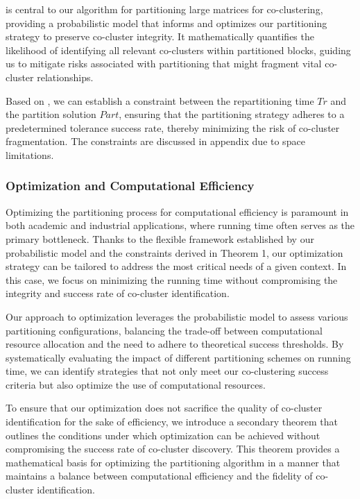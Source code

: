  is central to our algorithm for partitioning large matrices for co-clustering, providing a probabilistic model that informs and optimizes our partitioning strategy to preserve co-cluster integrity. It mathematically quantifies the likelihood of identifying all relevant co-clusters within partitioned blocks, guiding us to mitigate risks associated with partitioning that might fragment vital co-cluster relationships.

Based on , we can establish a constraint between the repartitioning time $Tr$ and the partition solution $Part$, ensuring that the partitioning strategy adheres to a predetermined tolerance success rate, thereby minimizing the risk of co-cluster fragmentation. The constraints are discussed in appendix due to space limitations.

\subsubsection{Optimization and Computational Efficiency}
Optimizing the partitioning process for computational efficiency is paramount in both academic and industrial applications, where running time often serves as the primary bottleneck. Thanks to the flexible framework established by our probabilistic model and the constraints derived in Theorem 1, our optimization strategy can be tailored to address the most critical needs of a given context. In this case, we focus on minimizing the running time without compromising the integrity and success rate of co-cluster identification.

Our approach to optimization leverages the probabilistic model to assess various partitioning configurations, balancing the trade-off between computational resource allocation and the need to adhere to theoretical success thresholds. By systematically evaluating the impact of different partitioning schemes on running time, we can identify strategies that not only meet our co-clustering success criteria but also optimize the use of computational resources.

To ensure that our optimization does not sacrifice the quality of co-cluster identification for the sake of efficiency, we introduce a secondary theorem that outlines the conditions under which optimization can be achieved without compromising the success rate of co-cluster discovery. This theorem provides a mathematical basis for optimizing the partitioning algorithm in a manner that maintains a balance between computational efficiency and the fidelity of co-cluster identification.


